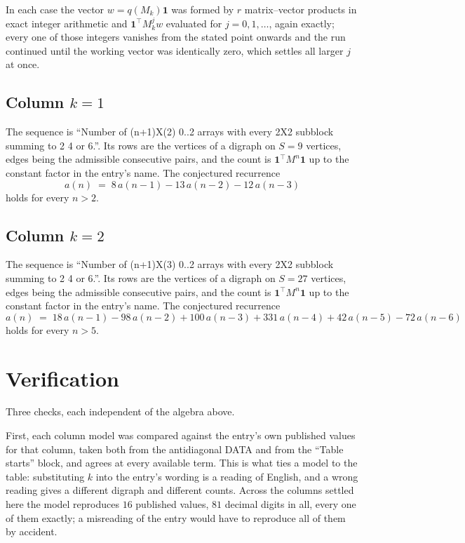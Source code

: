 \documentclass[11pt,a4paper]{article}
\theoremstyle{plain}
\theoremstyle{definition}
\begin{document}
In each case the vector $w=q(M_k)\mathbf{1}$ was formed by $r$ matrix--vector products in
exact integer arithmetic and $\mathbf{1}^{\!\top}M_k^{j}w$ evaluated for $j=0,1,\dots$,
again exactly; every one of those integers vanishes from the stated point onwards and the run
continued until the working vector was identically zero, which settles all larger $j$ at once.

\subsection*{Column $k=1$}
The sequence is ``Number of (n+1)X(2) 0..2 arrays with every 2X2 subblock summing to 2 4 or 6.''. Its rows are the vertices of a digraph on
$S=9$ vertices, edges being the admissible consecutive pairs, and the count is
$\mathbf{1}^{\!\top}M^{n}\mathbf{1}$ up to the constant factor in the entry's name.
The conjectured recurrence
\[
a(n)\;=\;8\,a(n-1) - 13\,a(n-2) - 12\,a(n-3)
\]
holds for every $n>2$.

\subsection*{Column $k=2$}
The sequence is ``Number of (n+1)X(3) 0..2 arrays with every 2X2 subblock summing to 2 4 or 6.''. Its rows are the vertices of a digraph on
$S=27$ vertices, edges being the admissible consecutive pairs, and the count is
$\mathbf{1}^{\!\top}M^{n}\mathbf{1}$ up to the constant factor in the entry's name.
The conjectured recurrence
\[
a(n)\;=\;18\,a(n-1) - 98\,a(n-2) + 100\,a(n-3) + 331\,a(n-4) + 42\,a(n-5) - 72\,a(n-6)
\]
holds for every $n>5$.

\section{Verification}

Three checks, each independent of the algebra above.

First, each column model was compared against the entry's own published values for that
column, taken both from the antidiagonal DATA and from the ``Table starts'' block, and agrees
at every available term. This is what ties a model to the table: substituting $k$ into the
entry's wording is a reading of English, and a wrong reading gives a different digraph and
different counts. Across the columns settled here the model reproduces $16$ published
values, $81$ decimal digits in all, every one of them exactly; a misreading of the entry
would have to reproduce all of them by accident.
\end{document}

